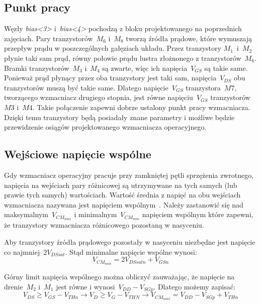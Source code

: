 \documentclass[twoside,pl,final]{labman}
\begin{document}
\subsection{Punkt pracy}
\label{schematic:op}
Węzły \emph{bias<3>} i~\emph{bias<4>} pochodzą z bloku
projektowanego na poprzednich zajęciach.
Pary tranzystorów~$M_6$ i~$M_8$ tworzą źródła prądowe,
które wymuszają przepływ prądu w poszczególnych gałęziach układu.
Przez tranzystory $M_1$~i~$M_2$ płynie taki sam prąd,
równy połowie prądu lustra złożnonego z tranzystorów~$M_6$.
Bramki tranzystorów~$M_3$ i~$M_4$ są zwarte,
więc ich napięcia~$V_{GS}$ są takie same.
Ponieważ prąd płynący przez oba tranzystory jest taki sam,
napięcia~$V_{DS}$ obu tranzystorów muszą być takie same.
Dlatego napięcie~$V_{GS}$ tranzystora~$M7$,
tworzącego wzmacniacz drugiego stopnia,
jest równe napięciu~$V_{GS}$ tranzystorów~$M3$ i~$M4$.
Takie połączenie zapewni dobrze ustalony punkt pracy wzmacniacza.
Dzięki temu tranzystory będą posiadały znane parametry i możliwe
będzie przewidzenie osiągów projektowanego wzmacniacza operacyjnego.

\subsection{Wejściowe napięcie wspólne}
\label{schematic:cm}
Gdy wzmacniacz operacyjny pracuje przy
zamkniętej pętli sprzężenia zwrotnego,
napięcia na wejściach pary różnicowej są utrzymywane na tych samych
(lub prawie tych samych) wartościach.
Wartość średnia z napięć na obu wejściach wzmacniacza
nazywana jest napięciem wspólnym~.
Należy zastanowić się nad maksymalnym~$V_{CM_{max}}$ i
minimalnym~$V_{CM_{min}}$ napięciem wspólnym które zapewni,
że tranzystory wzmacniacza różnicowego pozostaną w nasyceniu.

Aby tranzystory źródła prądowego pozostały w nasyceniu
niezbędne jest napięcie co najmniej~$2V_{DSsat}$.
Stąd minimalne napięcie wspólne wynosi:
\begin{equation}
  V_{CM_{min}} = 2V_{DSsatn} + V_{GSn}
\end{equation}

Górny limit napięcia wspólnego można obliczyć zauważając,
że napięcie na drenie~$M_2$ i~$M_1$ jest równe i wynosi~$V_{DD} - V_{SGp}$.
Dlatego możemy zapisać:
\begin{equation}
  V_{DS} \geq V_{GS} - V_{THn} \rightarrow
  V_D \geq V_G - V_{THN} \rightarrow
  V_{CM_{max}} = V_{DD} - V_{SGp} + V_{THn}
\end{equation}
\end{document}
